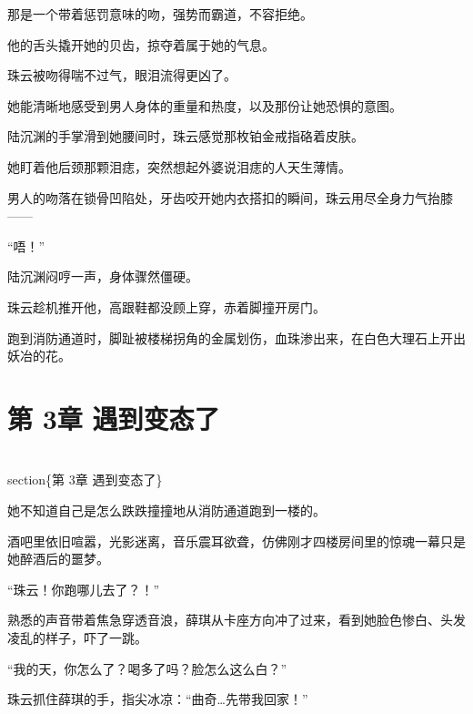 \documentclass[12pt,a4paper]{article}
\begin{document}
那是一个带着惩罚意味的吻，强势而霸道，不容拒绝。



他的舌头撬开她的贝齿，掠夺着属于她的气息。



珠云被吻得喘不过气，眼泪流得更凶了。



她能清晰地感受到男人身体的重量和热度，以及那份让她恐惧的意图。



陆沉渊的手掌滑到她腰间时，珠云感觉那枚铂金戒指硌着皮肤。



她盯着他后颈那颗泪痣，突然想起外婆说泪痣的人天生薄情。



男人的吻落在锁骨凹陷处，牙齿咬开她内衣搭扣的瞬间，珠云用尽全身力气抬膝——



“唔！”



陆沉渊闷哼一声，身体骤然僵硬。



珠云趁机推开他，高跟鞋都没顾上穿，赤着脚撞开房门。



跑到消防通道时，脚趾被楼梯拐角的金属划伤，血珠渗出来，在白色大理石上开出妖冶的花。



\section{第 3章 遇到变态了}


\\section\{第 3章 遇到变态了\}

她不知道自己是怎么跌跌撞撞地从消防通道跑到一楼的。



酒吧里依旧喧嚣，光影迷离，音乐震耳欲聋，仿佛刚才四楼房间里的惊魂一幕只是她醉酒后的噩梦。



“珠云！你跑哪儿去了？！”



熟悉的声音带着焦急穿透音浪，薛琪从卡座方向冲了过来，看到她脸色惨白、头发凌乱的样子，吓了一跳。



“我的天，你怎么了？喝多了吗？脸怎么这么白？”



珠云抓住薛琪的手，指尖冰凉：“曲奇…先带我回家！”
\end{document}
